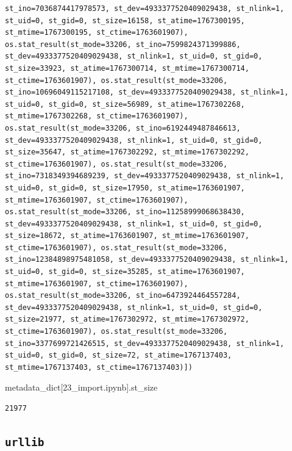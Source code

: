 \documentclass[
  spanish,
  letterpaper,
]{scrbook}
\newenvironment{Shaded}{\begin{snugshade}}{\end{snugshade}}
\newcommand{\NormalTok}[1]{\textcolor[rgb]{0.00,0.23,0.31}{#1}}
\newcommand{\StringTok}[1]{\textcolor[rgb]{0.13,0.47,0.30}{#1}}
\theoremstyle{definition}
\theoremstyle{remark}
\begin{document}
\begin{verbatim}
st_ino=7036874417978573, st_dev=4933377520409029438, st_nlink=1, st_uid=0, st_gid=0, st_size=16158, st_atime=1767300195, st_mtime=1767300195, st_ctime=1763601907), os.stat_result(st_mode=33206, st_ino=7599824371399886, st_dev=4933377520409029438, st_nlink=1, st_uid=0, st_gid=0, st_size=33923, st_atime=1767300714, st_mtime=1767300714, st_ctime=1763601907), os.stat_result(st_mode=33206, st_ino=10696049115217108, st_dev=4933377520409029438, st_nlink=1, st_uid=0, st_gid=0, st_size=56989, st_atime=1767302268, st_mtime=1767302268, st_ctime=1763601907), os.stat_result(st_mode=33206, st_ino=6192449487846613, st_dev=4933377520409029438, st_nlink=1, st_uid=0, st_gid=0, st_size=35647, st_atime=1767302292, st_mtime=1767302292, st_ctime=1763601907), os.stat_result(st_mode=33206, st_ino=7318349394689239, st_dev=4933377520409029438, st_nlink=1, st_uid=0, st_gid=0, st_size=17950, st_atime=1763601907, st_mtime=1763601907, st_ctime=1763601907), os.stat_result(st_mode=33206, st_ino=11258999068638430, st_dev=4933377520409029438, st_nlink=1, st_uid=0, st_gid=0, st_size=18672, st_atime=1763601907, st_mtime=1763601907, st_ctime=1763601907), os.stat_result(st_mode=33206, st_ino=12384898975481058, st_dev=4933377520409029438, st_nlink=1, st_uid=0, st_gid=0, st_size=35285, st_atime=1763601907, st_mtime=1763601907, st_ctime=1763601907), os.stat_result(st_mode=33206, st_ino=6473924464557284, st_dev=4933377520409029438, st_nlink=1, st_uid=0, st_gid=0, st_size=21977, st_atime=1767302972, st_mtime=1767302972, st_ctime=1763601907), os.stat_result(st_mode=33206, st_ino=3377699721426515, st_dev=4933377520409029438, st_nlink=1, st_uid=0, st_gid=0, st_size=72, st_atime=1767137403, st_mtime=1767137403, st_ctime=1767137403)])
\end{verbatim}

\begin{Shaded}
\begin{Highlighting}[]
\NormalTok{metadata\_dict[}\StringTok{\textquotesingle{}23\_import.ipynb\textquotesingle{}}\NormalTok{].st\_size}
\end{Highlighting}
\end{Shaded}

\begin{verbatim}
21977
\end{verbatim}

\subsection{\texorpdfstring{\texttt{urllib}}{urllib}}\label{urllib}
\end{document}
